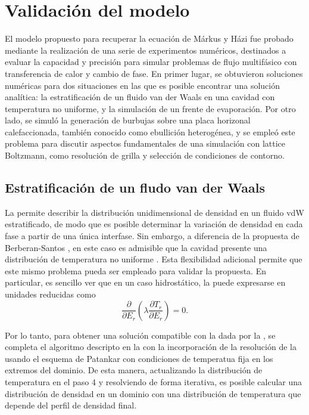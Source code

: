 \section{Validaci\'on del modelo}

El modelo propuesto para recuperar la ecuaci\'on de M\'arkus y H\'azi fue probado mediante la realizaci\'on de una serie de experimentos num\'ericos, destinados a evaluar la capacidad y precisi\'on para simular problemas de flujo multif\'asico con transferencia de calor y cambio de fase. En primer lugar, se obtuvieron soluciones num\'ericas para dos situaciones en las que es posible encontrar una soluci\'on anal\'itica: la estratificaci\'on de un fluido van der Waals en una cavidad con temperatura no uniforme, y la simulaci\'on de un frente de evaporaci\'on. Por otro lado, se simul\'o la generaci\'on de burbujas sobre una placa horizonal calefaccionada, tambi\'en conocido como ebullici\'on heterog\'enea, y se emple\'o este problema para discutir aspectos fundamentales de una simulaci\'on con lattice Boltzmann, como resoluci\'on de grilla y selecci\'on de condiciones de contorno.



\subsection{Estratificaci\'on de un fludo van der Waals}
\label{sec:vdWColumnHT}

La  permite describir la distribuci\'on unidimensional de densidad en un fluido vdW estratificado, de modo que es posible determinar la variaci\'on de densidad en cada fase a partir de una \'unica interfase. Sin embargo, a diferencia de la propuesta de Berberan-Santos \cite{berberan-santos_liquidvapor_2002}, en este caso es admisible que la cavidad presente una distribuci\'on de temperatura no uniforme \cite{fogliatto_simulation_2019}. Esta flexibilidad adicional permite que este mismo problema pueda ser empleado para validar la \lbe{} propuesta. En particular, es sencillo ver que en un caso hidrost\'atico, la  puede expresarse en unidades reducidas como
\begin{equation}
	\dfrac{\partial}{\partial E_r} \left( \lambda \dfrac{\partial T_r}{\partial E_r} \right) = 0.
	\label{eq:markus_1d}
\end{equation}

Por lo tanto, para obtener una soluci\'on compatible con la \lbe{} dada por la , se completa el algoritmo descripto en la  con la incorporaci\'on de la resoluci\'on de la  usando el esquema de Patankar \cite{patankar_numerical_1980} con condiciones de temperatua fija en los extremos del dominio. De esta manera, actualizando la distribuci\'on de temperatura en el paso 4 y resolviendo de forma iterativa, es posible calcular una distribuci\'on de densidad en un dominio con una distribuci\'on de temperatura que depende del perfil de densidad final. 

